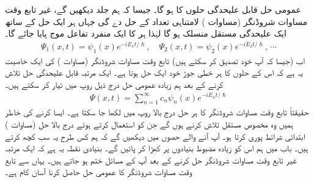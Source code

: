 \quad
عمومی حل قابل علیحدگی حلوں کا  ہو گا۔ جیسا کہ ہم جلد دیکھیں گے، غیر تابع وقت مساوات شروڈنگر (مساوات ) لامتناہی تعداد کے حل  دے گی جہاں ہر ایک حل کے ساتھ ایک علیحدگی مستقل  منسلک ہو گا لہٰذا ہر  کا ایک منفرد تفاعل موج پایا جائے گا۔ 
\begin{align*}
\Psi_{1} (x,t) = \psi_{1}(x)e^{-iE_{1}t/\hslash} , \quad \Psi_{2} (x,t) = \psi_{2}(x)e^{-iE_{2}t/\hslash}, \, \cdots 
\end{align*}
اب (جیسا کہ آپ خود تصدیق کر سکتے ہیں) تابع وقت مساوات شروڈنگر (مساوات ) کی ایک خاصیت یہ ہے کہ اس کے حلوں کا ہر خطی جوڑ خود ایک حل ہوتا ہے۔ ایک مرتبہ قابل علیحدگی حل تلاش کرنے کے بعد ہم زیادہ عمومی حل درج ذیل روپ میں تیار کر سکتے ہیں۔
\begin{align}\label{مساوات_شروڈنگر_خطی_جوڑ_عمومی_حل}
\Psi (x,t) = \sum_{n=1}^{\infty} c_{n} \psi_{n}(x)e^{-iE_{n}t/\hslash}
\end{align}
حقیقتاً تابع وقت مساوات شروڈنگر کا ہر حل درج بالا روپ میں لکھا جا سکتا ہے۔ ایسا کرنے کی خاطر ہمیں وہ مخصوص مستقل  تلاش کرنے ہوں گے جن کو استعمال کرتے ہوئے درج بالا حل (مساوات ) ابتدائی شرائط پوری کرتا ہو۔ آپ آنے والے حصوں میں دیکھیں گے کہ ہم کس طرح یہ سب کچھ کرتے ہیں۔ باب  میں ہم اس کو زیادہ مضبوط بنیادوں پر کھڑا کر پائیں گے۔ بنیادی نقطہ یہ ہے کہ ایک مرتبہ غیر تابع وقت مساوات شروڈنگر حل کرنے کے بعد آپ کے مسائل ختم ہو جاتے ہیں۔ یہاں سے تابع وقت مساوات شروڈنگر کا عمومی حل حاصل کرنا آسان کام ہے۔ 

